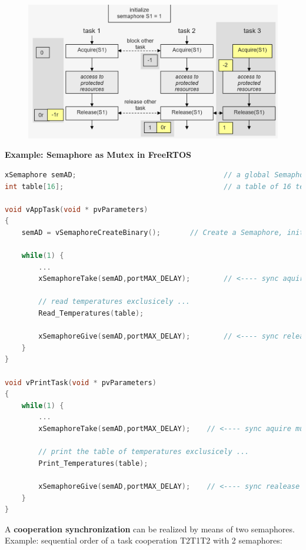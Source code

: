  	\begin{figure}[h]
    \centering
    \includegraphics[width=13cm, height=6cm]{Images/image106.png}
    \label{fig:Fig }
    \end{figure}


\textbf{Example: Semaphore as Mutex in FreeRTOS}

\begin{lstlisting}[style=mystyle, language=c]
xSemaphore semAD;									// a global Semaphore
int table[16];										// a table of 16 temperatures

void vAppTask(void * pvParameters)
{
	semAD = vSemaphoreCreateBinary();		// Create a Semaphore, initially 1 

	while(1) {
		...
		xSemaphoreTake(semAD,portMAX_DELAY);		// <---- sync aquire mutex
		
		// read temperatures exclusicely ...
		Read_Temperatures(table);

		xSemaphoreGive(semAD,portMAX_DELAY);		// <---- sync release the mutex
 	}
}

void vPrintTask(void * pvParameters)
{
	while(1) {
		...
		xSemaphoreTake(semAD,portMAX_DELAY);	// <---- sync aquire mutex
		
		// print the table of temperatures exclusicely ...
		Print_Temperatures(table);

		xSemaphoreGive(semAD,portMAX_DELAY);	// <---- sync realease the mutex !
 	}
}
\end{lstlisting}

A \textbf{cooperation synchronization} can be realized by means of two semaphores. Example: sequential order of a task cooperation T2T1T2 with 2 semaphores:

